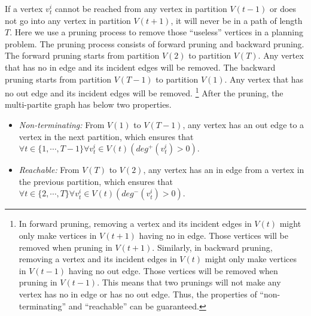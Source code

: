If a vertex $ v^{i}_{t} $ cannot be reached from any vertex in partition $ V(t-1) $ or does not go into any vertex in partition $ V(t+1) $, it will never be in a path of length $ T $.
Here we use a pruning process to remove those ``useless'' vertices in a planning problem.
The pruning process consists of forward pruning and backward pruning.
The forward pruning starts from partition $ V(2) $ to partition $ V(T) $.
Any vertex that has no in edge and its incident edges will be removed.
The backward pruning starts from partition $ V(T-1) $ to partition $ V(1) $.
Any vertex that has no out edge and its incident edges will be removed.
\footnote{In forward pruning, removing a vertex and its incident edges in $ V(t) $ might only make vertices in $ V(t+1) $ having no in edge.
Those vertices will be removed when pruning in $ V(t+1) $.
Similarly, in backward pruning, removing a vertex and its incident edges in $ V(t) $ might only make vertices in $ V(t-1) $ having no out edge.
Those vertices will be removed when pruning in $ V(t-1) $.  
This means that two prunings will not make any vertex has no in edge or has no out edge.
Thus, the properties of ``non-terminating'' and ``reachable'' can be guaranteed.}
After the pruning, the multi-partite graph has below two properties.
\begin{itemize}
\item \emph{Non-terminating:} From $ V(1) $ to $ V(T-1) $, any vertex has an out edge to a vertex in the next partition, which ensures that $ \forall t \in \{ 1 , \cdots , T-1 \} \forall v^{i}_{ t } \in V( t )  ( deg^{+}(v^{i}_{ t }) > 0 )  $.
\item \emph{Reachable:} From $ V(T) $ to $ V(2) $, any vertex has an in edge from a vertex in the previous partition, which ensures that $ \forall t \in \{ 2, \cdots , T \} \forall v^{i}_{ t } \in V( t )  ( deg^{-}(v^{i}_{ t }) > 0 )  $. 
\end{itemize}